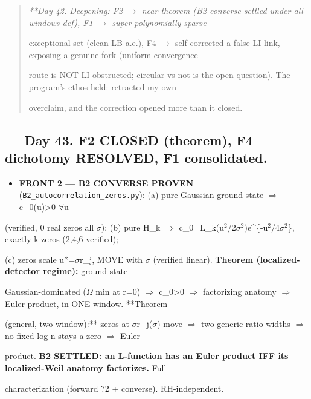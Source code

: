 \documentclass[10pt]{article}
\begin{document}
\begin{quote}\itshape
**Day-42. Deepening: F2 \ensuremath{\to} near-theorem (B2 converse settled under all-windows def), F1 \ensuremath{\to} super-polynomially sparse\par
exceptional set (clean LB a.e.), F4 \ensuremath{\to} self-corrected a false LI link, exposing a genuine fork (uniform-convergence\par
route is NOT LI-obstructed; circular-vs-not is the open question). The program's ethos held: retracted my own\par
overclaim, and the correction opened more than it closed.\par
\end{quote}

\subsection*{ --- Day 43. F2 CLOSED (theorem), F4 dichotomy RESOLVED, F1 consolidated.}
\begin{itemize}
\item \textbf{FRONT 2 --- B2 CONVERSE PROVEN} (\texttt{B2\_autocorrelation\_zeros.py}): (a) pure-Gaussian ground state \ensuremath{\Rightarrow} c\_0(u)>0 \ensuremath{\forall}u
\end{itemize}
  (verified, 0 real zeros all \ensuremath{\sigma}); (b) pure H\_k \ensuremath{\Rightarrow} c\_0=L\_k(u\ensuremath{^2}/2\ensuremath{\sigma}\ensuremath{^2})e\textasciicircum{}\{-u\ensuremath{^2}/4\ensuremath{\sigma}\ensuremath{^2}\}, exactly k zeros (2,4,6 verified);\par
  (c) zeros scale u*=\ensuremath{\sigma}r\_j, MOVE with \ensuremath{\sigma} (verified linear). \textbf{Theorem (localized-detector regime):} ground state\par
  Gaussian-dominated (\ensuremath{\Omega} min at r=0) \ensuremath{\Rightarrow} c\_0>0 \ensuremath{\Rightarrow} factorizing anatomy \ensuremath{\Rightarrow} Euler product, in ONE window. **Theorem\par
  (general, two-window):** zeros at \ensuremath{\sigma}r\_j(\ensuremath{\sigma}) move \ensuremath{\Rightarrow} two generic-ratio widths \ensuremath{\Rightarrow} no fixed log n stays a zero \ensuremath{\Rightarrow} Euler\par
  product. \textbf{B2 SETTLED: an L-function has an Euler product IFF its localized-Weil anatomy factorizes.} Full\par
  characterization (forward ?2 + converse). RH-independent.\par
\end{document}
